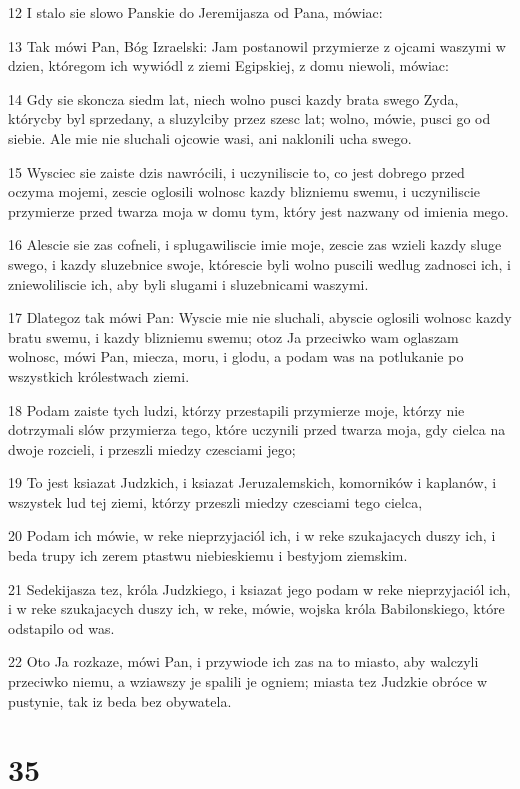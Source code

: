 \par 12 I stalo sie slowo Panskie do Jeremijasza od Pana, mówiac:
\par 13 Tak mówi Pan, Bóg Izraelski: Jam postanowil przymierze z ojcami waszymi w dzien, któregom ich wywiódl z ziemi Egipskiej, z domu niewoli, mówiac:
\par 14 Gdy sie skoncza siedm lat, niech wolno pusci kazdy brata swego Zyda, którycby byl sprzedany, a sluzylciby przez szesc lat; wolno, mówie, pusci go od siebie. Ale mie nie sluchali ojcowie wasi, ani naklonili ucha swego.
\par 15 Wysciec sie zaiste dzis nawrócili, i uczyniliscie to, co jest dobrego przed oczyma mojemi, zescie oglosili wolnosc kazdy blizniemu swemu, i uczyniliscie przymierze przed twarza moja w domu tym, który jest nazwany od imienia mego.
\par 16 Alescie sie zas cofneli, i splugawiliscie imie moje, zescie zas wzieli kazdy sluge swego, i kazdy sluzebnice swoje, którescie byli wolno puscili wedlug zadnosci ich, i zniewoliliscie ich, aby byli slugami i sluzebnicami waszymi.
\par 17 Dlategoz tak mówi Pan: Wyscie mie nie sluchali, abyscie oglosili wolnosc kazdy bratu swemu, i kazdy blizniemu swemu; otoz Ja przeciwko wam oglaszam wolnosc, mówi Pan, miecza, moru, i glodu, a podam was na potlukanie po wszystkich królestwach ziemi.
\par 18 Podam zaiste tych ludzi, którzy przestapili przymierze moje, którzy nie dotrzymali slów przymierza tego, które uczynili przed twarza moja, gdy cielca na dwoje rozcieli, i przeszli miedzy czesciami jego;
\par 19 To jest ksiazat Judzkich, i ksiazat Jeruzalemskich, komorników i kaplanów, i wszystek lud tej ziemi, którzy przeszli miedzy czesciami tego cielca,
\par 20 Podam ich mówie, w reke nieprzyjaciól ich, i w reke szukajacych duszy ich, i beda trupy ich zerem ptastwu niebieskiemu i bestyjom ziemskim.
\par 21 Sedekijasza tez, króla Judzkiego, i ksiazat jego podam w reke nieprzyjaciól ich, i w reke szukajacych duszy ich, w reke, mówie, wojska króla Babilonskiego, które odstapilo od was.
\par 22 Oto Ja rozkaze, mówi Pan, i przywiode ich zas na to miasto, aby walczyli przeciwko niemu, a wziawszy je spalili je ogniem; miasta tez Judzkie obróce w pustynie, tak iz beda bez obywatela.

\chapter{35}

